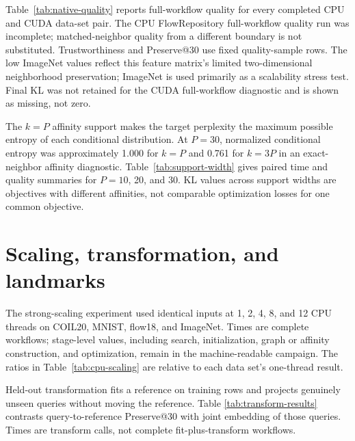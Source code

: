 \documentclass[article]{jss}
\begin{document}
Table~\ref{tab:native-quality} reports full-workflow quality for every
completed CPU and CUDA data-set pair. The CPU FlowRepository full-workflow
quality run was incomplete; matched-neighbor quality from a different
boundary is not substituted. Trustworthiness and Preserve@30 use fixed
quality-sample rows. The low ImageNet values reflect this feature matrix's
limited two-dimensional neighborhood preservation; ImageNet is used
primarily as a scalability stress test. Final KL was not retained for the
CUDA full-workflow diagnostic and is shown as missing, not zero.



The $k=P$ affinity support makes the target perplexity the maximum possible
entropy of each conditional distribution. At $P=30$, normalized conditional
entropy was approximately 1.000 for $k=P$ and 0.761 for $k=3P$ in an
exact-neighbor affinity diagnostic. Table~\ref{tab:support-width} gives
paired time and quality summaries for $P=10$, 20, and 30. KL values across
support widths are objectives with different affinities, not comparable
optimization losses for one common objective.



\section{Scaling, transformation, and landmarks}

The strong-scaling experiment used identical inputs at 1, 2, 4, 8, and
12 CPU threads on COIL20, MNIST, flow18, and ImageNet. Times are complete
workflows; stage-level values, including search, initialization, graph or
affinity construction, and optimization, remain in the machine-readable
campaign. The ratios in Table~\ref{tab:cpu-scaling} are relative to each
data set's one-thread result.

\begin{table}[htbp]
\centering
\scriptsize
\caption{CPU full-workflow strong scaling in campaign
  20260930T203319Z. Speedups at 2--12 threads are relative to the
  one-thread elapsed time in the same row.}
\label{tab:cpu-scaling}

\end{table}

Held-out transformation fits a reference on training rows and projects
genuinely unseen queries without moving the reference. Table
\ref{tab:transform-results} contrasts query-to-reference Preserve@30 with
joint embedding of those queries. Times are transform calls, not complete
fit-plus-transform workflows.
\end{document}
